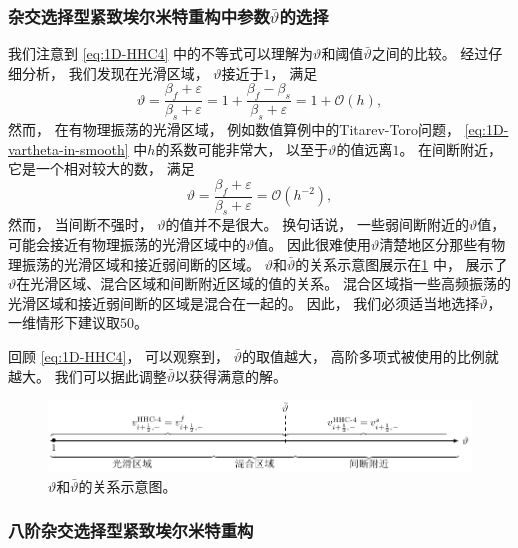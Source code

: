\subsubsection{杂交选择型紧致埃尔米特重构中参数$\bar\vartheta$的选择}

我们注意到 \cref{eq:1D-HHC4} 中的不等式可以理解为$\vartheta$和阈值$\bar\vartheta$之间的比较。
经过仔细分析，
我们发现在光滑区域，
$\vartheta$接近于$1$，
满足
\begin{equation}
  \label{eq:1D-vartheta-in-smooth}
  \vartheta = \frac{\beta_{{f}}+ \varepsilon}{\beta_{{s}}+ \varepsilon}
  = 1 + \frac{\beta_{{f}}- \beta_{{s}}}{\beta_{{s}}+ \varepsilon}= 1 + {\mathcal{O}}(h),
\end{equation}
然而，
在有物理振荡的光滑区域，
例如数值算例中的Titarev-Toro问题，
\cref{eq:1D-vartheta-in-smooth} 中$h$的系数可能非常大，
以至于$\vartheta$的值远离$1$。
在间断附近，
它是一个相对较大的数，
满足
\begin{equation}
  \vartheta = \frac{\beta_{{f}}+ \varepsilon}{\beta_{{s}}+ \varepsilon}= {\mathcal{O}}(h^{-2}),
\end{equation}
然而，
当间断不强时，
$\vartheta$的值并不是很大。
换句话说，
一些弱间断附近的$\vartheta$值，
可能会接近有物理振荡的光滑区域中的$\vartheta$值。
因此很难使用$\vartheta$清楚地区分那些有物理振荡的光滑区域和接近弱间断的区域。
$\vartheta$和$\bar\vartheta$的关系示意图展示在\cref{fig:1D-vartheta} 中，
展示了$\vartheta$在光滑区域、混合区域和间断附近区域的值的关系。
混合区域指一些高频振荡的光滑区域和接近弱间断的区域是混合在一起的。
因此，
我们必须适当地选择$\bar\vartheta$，
一维情形下建议取$50$。

回顾 \cref{eq:1D-HHC4}，
可以观察到，
$\bar\vartheta$的取值越大，
高阶多项式被使用的比例就越大。
我们可以据此调整$\bar\vartheta$以获得满意的解。

\begin{figure}[htbp]
  \centering
  \includegraphics{fig/tikz/vartheta-1D.pdf}
  \caption{$\vartheta$和$\bar\vartheta$的关系示意图。
  }
  \label{fig:1D-vartheta}
\end{figure}

\subsubsection{八阶杂交选择型紧致埃尔米特重构}

